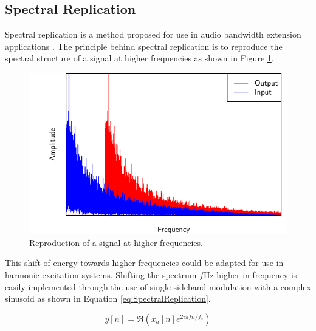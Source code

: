 	\subsection{Spectral Replication}
	\label{sec:Excitation-Methods-SpectralReplication}
		Spectral replication is a method proposed for use in audio bandwidth extension applications
		\citep{nagel2010a}. The principle behind spectral replication is to reproduce the spectral structure of a
		signal at higher frequencies as shown in Figure \ref{fig:SpectralReplication}.

		\begin{figure}[h!]
			\centering
			\includegraphics{chapter3/Images/SpectralReplicationSpectrum.pdf}
			\caption{Reproduction of a signal at higher frequencies.}
			\label{fig:SpectralReplication}
		\end{figure}

		This shift of energy towards higher frequencies could be adapted for use in harmonic excitation systems.
		Shifting the spectrum $f$Hz higher in frequency is easily implemented through the use of single sideband
		modulation with a complex sinusoid as shown in Equation \ref{eq:SpectralReplication}.

		\begin{equation}
			y[n] = \Re \left( x_{a}[n] e^{2i\pi fn/ f_{s}} \right)
			\label{eq:SpectralReplication}
		\end{equation}

